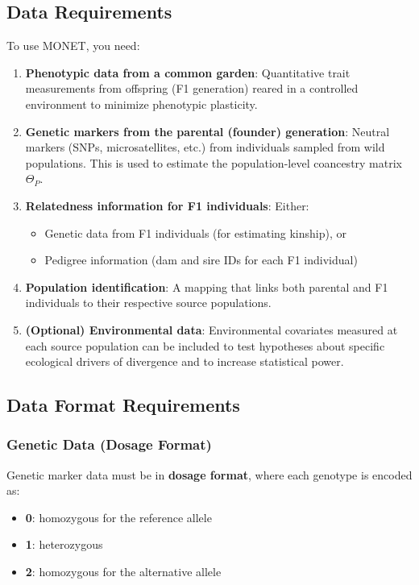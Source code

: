 \documentclass[11pt]{article}
\begin{document}
\subsection{Data Requirements}

To use MONET, you need:

\begin{enumerate}
\item \textbf{Phenotypic data from a common garden}: Quantitative trait measurements from offspring (F1 generation) reared in a controlled environment to minimize phenotypic plasticity.

\item \textbf{Genetic markers from the parental (founder) generation}: Neutral markers (SNPs, microsatellites, etc.) from individuals sampled from wild populations. This is used to estimate the population-level coancestry matrix $\Theta_P$.

\item \textbf{Relatedness information for F1 individuals}: Either:
   \begin{itemize}
   \item Genetic data from F1 individuals (for estimating kinship), or
   \item Pedigree information (dam and sire IDs for each F1 individual)
   \end{itemize}

\item \textbf{Population identification}: A mapping that links both parental and F1 individuals to their respective source populations.

\item \textbf{(Optional) Environmental data}: Environmental covariates measured at each source population can be included to test hypotheses about specific ecological drivers of divergence and to increase statistical power.
\end{enumerate}

\subsection{Data Format Requirements}

\subsubsection{Genetic Data (Dosage Format)}

Genetic marker data must be in \textbf{dosage format}, where each genotype is encoded as:
\begin{itemize}
\item \textbf{0}: homozygous for the reference allele
\item \textbf{1}: heterozygous
\item \textbf{2}: homozygous for the alternative allele
\end{itemize}
\end{document}
